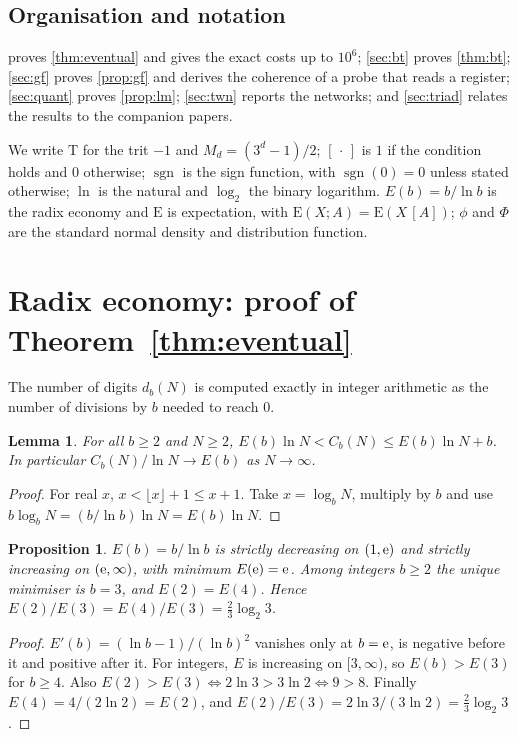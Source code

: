 \documentclass[11pt]{article}
\newtheorem{lemma}[theorem]{Lemma}
\newtheorem{proposition}[theorem]{Proposition}
\theoremstyle{definition}\newtheorem{definition}[theorem]{Definition}
\theoremstyle{remark}\newtheorem{remark}[theorem]{Remark}
\newcommand{\T}{\mathrm{T}}
\newcommand{\sgn}{\operatorname{sgn}}
\begin{document}
\subsection{Organisation and notation}
 proves \cref{thm:eventual} and gives the exact costs up to $10^6$; \cref{sec:bt} proves \cref{thm:bt}; \cref{sec:gf} proves \cref{prop:gf} and derives the coherence of a probe that reads a register; \cref{sec:quant} proves \cref{prop:lm}; \cref{sec:twn} reports the networks; and \cref{sec:triad} relates the results to the companion papers.

We write $\T$ for the trit $-1$ and $M_d=(3^d-1)/2$; $[\,\cdot\,]$ is $1$ if the condition holds and $0$ otherwise; $\sgn$ is the sign function, with $\sgn(0)=0$ unless stated otherwise; $\ln$ is the natural and $\log_2$ the binary logarithm. $E(b)=b/\ln b$ is the radix economy and $\mathrm E$ is expectation, with $\mathrm E(X;A)=\mathrm E(X\,[A])$; $\phi$ and $\Phi$ are the standard normal density and distribution function.

\section{Radix economy: proof of \texorpdfstring{Theorem~\ref{thm:eventual}}{Theorem 1.1}}\label{sec:radix}
The number of digits $d_b(N)$ is computed exactly in integer arithmetic as the number of divisions by $b$ needed to reach $0$.

\begin{lemma}\label{lem:bounds}
For all $b\ge2$ and $N\ge2$, $E(b)\ln N<C_b(N)\le E(b)\ln N+b$. In particular $C_b(N)/\ln N\to E(b)$ as $N\to\infty$.
\end{lemma}
\begin{proof}
For real $x$, $x<\lfloor x\rfloor+1\le x+1$. Take $x=\log_b N$, multiply by $b$ and use $b\log_b N=(b/\ln b)\ln N=E(b)\ln N$.
\end{proof}

\begin{proposition}\label{prop:radix}
$E(b)=b/\ln b$ is strictly decreasing on $(1,\mathrm e)$ and strictly increasing on $(\mathrm e,\infty)$, with minimum $E(\mathrm e)=\mathrm e$. Among integers $b\ge 2$ the unique minimiser is $b=3$, and $E(2)=E(4)$. Hence $E(2)/E(3)=E(4)/E(3)=\frac23\log_{2}3$.
\end{proposition}
\begin{proof}
$E'(b)=(\ln b-1)/(\ln b)^2$ vanishes only at $b=\mathrm e$, is negative before it and positive after it. For integers, $E$ is increasing on $[3,\infty)$, so $E(b)>E(3)$ for $b\ge 4$. Also $E(2)>E(3)\iff 2\ln 3>3\ln 2\iff 9>8$. Finally $E(4)=4/(2\ln 2)=E(2)$, and $E(2)/E(3)=2\ln 3/(3\ln 2)=\frac23\log_{2}3$.
\end{proof}
\end{document}

